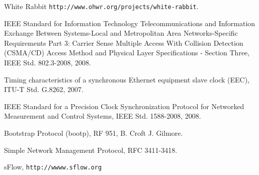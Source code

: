 \begin{thebibliography}{9}   %

White Rabbit \texttt{http://www.ohwr.org/projects/white-rabbit}.

 IEEE Standard for Information Technology Telecommunications and
Information Exchange Between Systems-Local and Metropolitan Area
Networks-Specific Requirements Part 3: Carrier Sense Multiple Access
With Collision Detection (CSMA/CD) Access Method and Physical
Layer Specifications - Section Three, IEEE Std. 802.3-2008, 2008.
 
Timing characteristics of a synchronous Ethernet equipment slave clock 
(EEC), ITU-T Std. G.8262, 2007.
 
IEEE Standard for a Precision Clock Synchronization Protocol for
  Networked Measurement and Control Systems, IEEE Std. 1588-2008,
  2008.

 Bootstrap Protocol (bootp), RF 951, B. Croft J. Gilmore.

 Simple Network Management Protocol, RFC 3411-3418.

 sFlow, \texttt{http://wwww.sflow.org}



\end{thebibliography}


